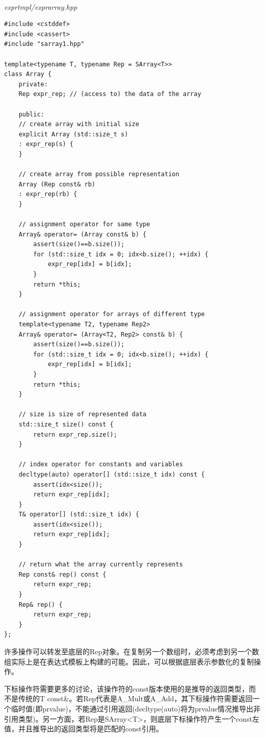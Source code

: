 \hspace*{\fill} \\ %
\noindent
\textit{exprtmpl/exprarray.hpp}
\begin{lstlisting}[style=styleCXX]
#include <cstddef>
#include <cassert>
#include "sarray1.hpp"

template<typename T, typename Rep = SArray<T>>
class Array {
	private:
	Rep expr_rep; // (access to) the data of the array
	
	public:
	// create array with initial size
	explicit Array (std::size_t s)
	: expr_rep(s) {
	}

	// create array from possible representation
	Array (Rep const& rb)
	: expr_rep(rb) {
	}

	// assignment operator for same type
	Array& operator= (Array const& b) {
		assert(size()==b.size());
		for (std::size_t idx = 0; idx<b.size(); ++idx) {
			expr_rep[idx] = b[idx];
		}
		return *this;
	}

	// assignment operator for arrays of different type
	template<typename T2, typename Rep2>
	Array& operator= (Array<T2, Rep2> const& b) {
		assert(size()==b.size());
		for (std::size_t idx = 0; idx<b.size(); ++idx) {
			expr_rep[idx] = b[idx];
		}
		return *this;
	}

	// size is size of represented data
	std::size_t size() const {
		return expr_rep.size();
	}

	// index operator for constants and variables
	decltype(auto) operator[] (std::size_t idx) const {
		assert(idx<size());
		return expr_rep[idx];
	}
	T& operator[] (std::size_t idx) {
		assert(idx<size());
		return expr_rep[idx];
	}

	// return what the array currently represents
	Rep const& rep() const {
		return expr_rep;
	}
	Rep& rep() {
		return expr_rep;
	}
};
\end{lstlisting}

许多操作可以转发至底层的Rep对象。在复制另一个数组时，必须考虑到另一个数组实际上是在表达式模板上构建的可能。因此，可以根据底层表示参数化的复制操作。

下标操作符需要更多的讨论，该操作符的const版本使用的是推导的返回类型，而不是传统的T const\&。若Rep代表是A\_Mult或A\_Add，其下标操作符需要返回一个临时值(即prvalue)，不能通过引用返回(decltype(auto)将为prvalue情况推导出非引用类型)。另一方面，若Rep是SArray<T>，则底层下标操作符产生一个const左值，并且推导出的返回类型将是匹配的const引用。


